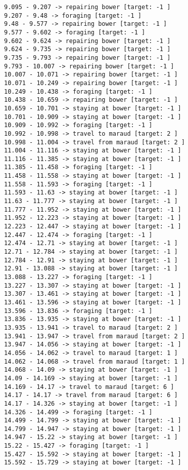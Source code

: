 \documentclass[11pt]{article}
\begin{document}
\begin{Verbatim}[commandchars=\\\{\}]
9.095 - 9.207 -> repairing bower [target: -1 ]
9.207 - 9.48 -> foraging [target: -1 ]
9.48 - 9.577 -> repairing bower [target: -1 ]
9.577 - 9.602 -> foraging [target: -1 ]
9.602 - 9.624 -> repairing bower [target: -1 ]
9.624 - 9.735 -> repairing bower [target: -1 ]
9.735 - 9.793 -> repairing bower [target: -1 ]
9.793 - 10.007 -> repairing bower [target: -1 ]
10.007 - 10.071 -> repairing bower [target: -1 ]
10.071 - 10.249 -> repairing bower [target: -1 ]
10.249 - 10.438 -> foraging [target: -1 ]
10.438 - 10.659 -> repairing bower [target: -1 ]
10.659 - 10.701 -> staying at bower [target: -1 ]
10.701 - 10.909 -> staying at bower [target: -1 ]
10.909 - 10.992 -> foraging [target: -1 ]
10.992 - 10.998 -> travel to maraud [target: 2 ]
10.998 - 11.004 -> travel from maraud [target: 2 ]
11.004 - 11.116 -> staying at bower [target: -1 ]
11.116 - 11.385 -> staying at bower [target: -1 ]
11.385 - 11.458 -> foraging [target: -1 ]
11.458 - 11.558 -> staying at bower [target: -1 ]
11.558 - 11.593 -> foraging [target: -1 ]
11.593 - 11.63 -> staying at bower [target: -1 ]
11.63 - 11.777 -> staying at bower [target: -1 ]
11.777 - 11.952 -> staying at bower [target: -1 ]
11.952 - 12.223 -> staying at bower [target: -1 ]
12.223 - 12.447 -> staying at bower [target: -1 ]
12.447 - 12.474 -> foraging [target: -1 ]
12.474 - 12.71 -> staying at bower [target: -1 ]
12.71 - 12.784 -> staying at bower [target: -1 ]
12.784 - 12.91 -> staying at bower [target: -1 ]
12.91 - 13.088 -> staying at bower [target: -1 ]
13.088 - 13.227 -> foraging [target: -1 ]
13.227 - 13.307 -> staying at bower [target: -1 ]
13.307 - 13.461 -> staying at bower [target: -1 ]
13.461 - 13.596 -> staying at bower [target: -1 ]
13.596 - 13.836 -> foraging [target: -1 ]
13.836 - 13.935 -> staying at bower [target: -1 ]
13.935 - 13.941 -> travel to maraud [target: 2 ]
13.941 - 13.947 -> travel from maraud [target: 2 ]
13.947 - 14.056 -> staying at bower [target: -1 ]
14.056 - 14.062 -> travel to maraud [target: 1 ]
14.062 - 14.068 -> travel from maraud [target: 1 ]
14.068 - 14.09 -> staying at bower [target: -1 ]
14.09 - 14.169 -> staying at bower [target: -1 ]
14.169 - 14.17 -> travel to maraud [target: 6 ]
14.17 - 14.17 -> travel from maraud [target: 6 ]
14.17 - 14.326 -> staying at bower [target: -1 ]
14.326 - 14.499 -> foraging [target: -1 ]
14.499 - 14.799 -> staying at bower [target: -1 ]
14.799 - 14.947 -> staying at bower [target: -1 ]
14.947 - 15.22 -> staying at bower [target: -1 ]
15.22 - 15.427 -> foraging [target: -1 ]
15.427 - 15.592 -> staying at bower [target: -1 ]
15.592 - 15.729 -> staying at bower [target: -1 ]

\end{Verbatim}
\end{document}
